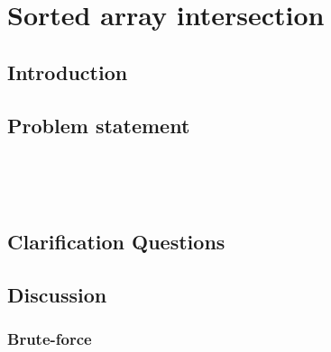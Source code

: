 %

\chapter{Sorted array intersection}
\label{ch:sorted_array_intersection}
\section*{Introduction}

\section{Problem statement}
\begin{exercise}

\end{exercise}


\begin{example}
	\hfill \
	
\end{example}

\begin{example}
	\hfill \
	
\end{example}

\section{Clarification Questions}

\begin{QandA}
	\item 
	\begin{answered}
		\textit{}
	\end{answered}
	
\end{QandA}

\section{Discussion}
\label{sorted_array_intersection:sec:discussion}


\subsection{Brute-force}
\label{sorted_array_intersection:sec:bruteforce}



